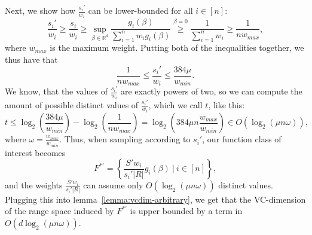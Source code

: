 Next, we show how $\frac{s_i'}{w_i}$ can be lower-bounded for all
$i \in [n]$:
\begin{equation*}
    \frac{s_i'}{w_i} \geq \frac{s_i}{w_i}
    \geq \sup_{\beta \in \mathbb{R}^d} \frac{g_i(\beta)}{\sum_{i=1}^n w_ig_i(\beta)}
    \overset{\beta = 0}{\geq} \frac{1}{\sum_{i=1}^n w_i}
    \geq \frac{1}{n w_{max}},
\end{equation*}
where $w_{max}$ is the maximum weight. Putting both of the inequalities
together, we thus have that
\begin{equation*}
    \frac{1}{n w_{max}} \leq \frac{s_i'}{w_i} \leq \frac{384\mu}{w_{min}}.
\end{equation*}
We know, that the values of $\frac{s_i'}{w_i}$ are exactly powers
of two, so we can compute the amount of possible distinct values of
$\frac{s_i'}{w_i}$, which we call $t$, like this:
\begin{equation*}
    t \leq \log_2\left( \frac{384 \mu}{w_{min}}\right)
    - \log_2\left( \frac{1}{n w_{max}}\right)
    = \log_2\left(384\mu n \frac{w_{max}}{w_{min}}\right)
    \in O\left(\log_2(\mu n \omega)\right),
\end{equation*}
where $\omega = \frac{w_{max}}{w_{min}}$.
Thus, when sampling according to $s_i'$, our function class of interest
becomes
\begin{equation*}
    F^{\ast'} = \left\{ \frac{S' w_i}{s_i' |R|} g_i(\beta) \ |\ i \in [n] \right\},
\end{equation*}
and the weights $\frac{S' w_i}{s_i' |R|}$ can assume only
$O(\log_2(\mu n \omega))$ distinct values.
Plugging this into lemma~\ref{lemma:vcdim-arbitrary}, we get that
the VC-dimension of the range space induced by $F^{\ast'}$ is
upper bounded by a term in $O(d \log_2(\mu n \omega))$.


